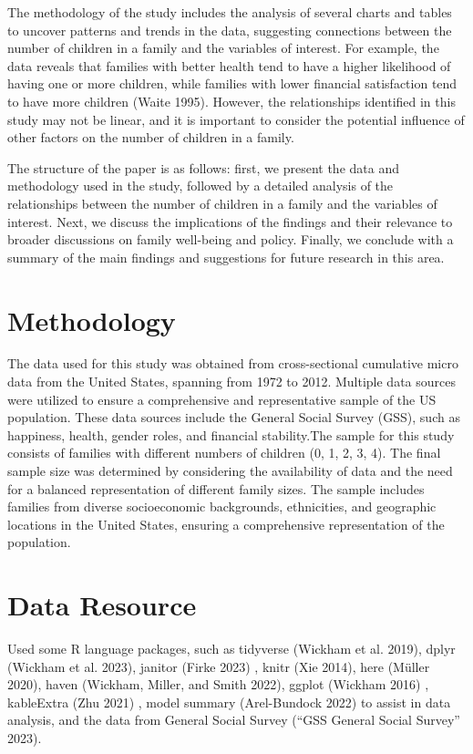 \documentclass[
  letterpaper,
  DIV=11,
  numbers=noendperiod]{scrartcl}
\begin{document}
The methodology of the study includes the analysis of several charts and
tables to uncover patterns and trends in the data, suggesting
connections between the number of children in a family and the variables
of interest. For example, the data reveals that families with better
health tend to have a higher likelihood of having one or more children,
while families with lower financial satisfaction tend to have more
children (Waite 1995). However, the relationships identified in this
study may not be linear, and it is important to consider the potential
influence of other factors on the number of children in a family.

The structure of the paper is as follows: first, we present the data and
methodology used in the study, followed by a detailed analysis of the
relationships between the number of children in a family and the
variables of interest. Next, we discuss the implications of the findings
and their relevance to broader discussions on family well-being and
policy. Finally, we conclude with a summary of the main findings and
suggestions for future research in this area.

\hypertarget{methodology}{%
\section{Methodology}\label{methodology}}

The data used for this study was obtained from cross-sectional
cumulative micro data from the United States, spanning from 1972 to
2012. Multiple data sources were utilized to ensure a comprehensive and
representative sample of the US population. These data sources include
the General Social Survey (GSS), such as happiness, health, gender
roles, and financial stability.The sample for this study consists of
families with different numbers of children (0, 1, 2, 3, 4). The final
sample size was determined by considering the availability of data and
the need for a balanced representation of different family sizes. The
sample includes families from diverse socioeconomic backgrounds,
ethnicities, and geographic locations in the United States, ensuring a
comprehensive representation of the population.

\hypertarget{data-resource}{%
\section{Data Resource}\label{data-resource}}

Used some R language packages, such as tidyverse (Wickham et al. 2019),
dplyr (Wickham et al. 2023), janitor (Firke 2023) , knitr (Xie 2014),
here (Müller 2020), haven (Wickham, Miller, and Smith 2022), ggplot
(Wickham 2016) , kableExtra (Zhu 2021) , model summary (Arel-Bundock
2022) to assist in data analysis, and the data from General Social
Survey ({``GSS General Social Survey''} 2023).
\end{document}
